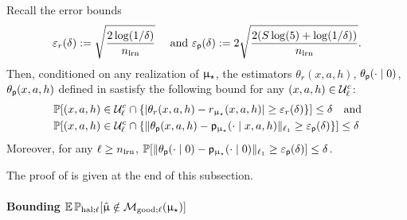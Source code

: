 \begin{lemma}\label{lem:conc_bounds} Recall the error bounds
\begin{align*}
\varepsilon_{r}(\delta) := \sqrt{ \frac{2\log(1/\delta)}{n_{\mathrm{lrn}}}} \quad \text{ and } \varepsilon_{\mathsf{p}}(\delta):= 2\sqrt{ \frac{2(S\log(5) + \log(1/\delta))}{n_{\mathrm{lrn}}}}.
\end{align*}
Then, conditioned on any realization of $\upmu_{\star}$, the estimators $\theta_r(x,a,h)$, $\theta_{\mathsf{p}}(\cdot \mid 0)$, $\theta_{\mathsf{p}}(x,a,h)$ defined in  sastisfy the following bound for any $(x,a,h) \in \mathcal{U}_{\ell}^c$:
\begin{align*}
&\operatorname{\mathbb{P}}[(x,a,h) \in \mathcal{U}_{\ell}^c \cap \{|\theta_r(x,a,h) - r_{\upmu_{\star}}(x,a,h)| \ge \varepsilon_{r}(\delta)\} ] \le \delta \quad \text{and}\\
&\operatorname{\mathbb{P}}[(x,a,h) \in \mathcal{U}_{\ell}^c \cap \{\|\theta_{\mathsf{p}}(x,a,h) - \mathsf{p}_{\upmu_{\star}}(\cdot \mid x,a,h)\|_{\ell_1} \ge \varepsilon_{\mathsf{p}}(\delta)\} ] \le \delta
\end{align*}
Moreover, for any $\ell \ge n_{\mathrm{lrn}}$, $\operatorname{\mathbb{P}}[\|\theta_{\mathsf{p}}(\cdot \mid 0) - \mathsf{p}_{\upmu_{\star}}(\cdot \mid 0)\|_{\ell_1} \ge \varepsilon_{\mathsf{p}}(\delta)] \le \delta$.
\end{lemma}
The proof of  is given at the end of this subsection.


\paragraph{Bounding $\Expop\Prhall[\modvarhat \notin \modgoodl(\modst)] $}
\newcommand{\rmterm}{\mathrm{MainTerm}}
\newcommand{\modsttil}{\tilde{\model}_{\star}}

